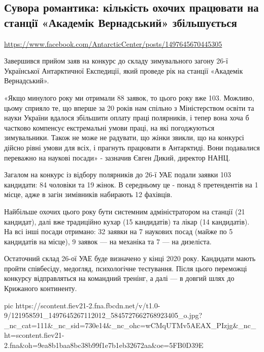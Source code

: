  
 

\subsection{Сувора романтика: кількість охочих працювати на станції «Академік Вернадський» збільшується}
\label{sec:16_10_2020.fb.ukr_antarctic_centre.1.zajavky}

\url{https://www.facebook.com/AntarcticCenter/posts/1497645670445305}

Завершився прийом заяв на конкурс до складу зимувального загону 26-ї
Української Антарктичної Експедиції, який проведе рік на станції «Академік
Вернадський».

«Якщо минулого року ми отримали 88 заявок, то цього року вже 103. Можливо,
цьому сприяло те, що вперше за 20 років нам спільно з Міністерством освіти та
науки України вдалося збільшити оплату праці полярників, і тепер вона хоча б
частково компенсує екстремальні умови праці, на які погоджуються зимувальники.
Також не може не радувати, що жінки звикли, що на конкурсі дійсно рівні умови
для всіх, і прагнуть працювати в Антарктиді. Вони подавалися переважно на
наукові посади» - зазначив Євген Дикий, директор НАНЦ.

Загалом на конкурс із відбору полярників до 26-ї УАЕ подали заявки 103
кандидати: 84 чоловіки та 19 жінок. В середньому це - понад 8 претендентів на 1
місце, адже в загін зимівників набирають 12 фахівців.

Найбільше охочих цього року бути системним адміністратором на станції (21
кандидат), далі вже традиційно кухар (15 кандидатів) та лікар (14 кандидатів).
На всі інші посади отримано: 32 заявки на 7 наукових посад (майже по 5
кандидатів на місце), 9 заявок --- на механіка та 7 --- на дизеліста. 

Остаточний склад 26-ої УАЕ буде визначено у кінці 2020 року. Кандидати мають
пройти співбесіду, медогляд, психологічне тестування. Після цього переможці
конкурсу відправляться на командний тренінг, а далі --- в довгий шлях до
Крижаного континенту.

\ifcmt
pic https://scontent.fiev21-2.fna.fbcdn.net/v/t1.0-9/121958591_1497645267112012_5845727662768923405_o.jpg?_nc_cat=111&_nc_sid=730e14&_nc_ohc=wCMqUTMv5AEAX_PIzjg&_nc_ht=scontent.fiev21-2.fna&oh=9ea8b1baa8bc38b99f1e7b1eb32672aa&oe=5FB0D39E
\fi

